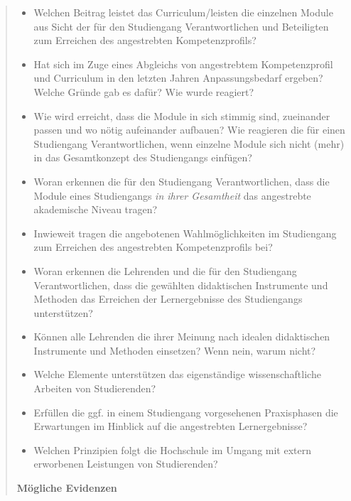 \begin{quote}
\begin{itemize}
\item
  Welchen Beitrag leistet das Curriculum/leisten die einzelnen Module
  aus Sicht der für den Studiengang Verantwortlichen und Beteiligten zum
  Erreichen des angestrebten Kompetenzprofils?
\item
  Hat sich im Zuge eines Abgleichs von angestrebtem Kompetenzprofil und
  Curriculum in den letzten Jahren Anpassungsbedarf ergeben? Welche
  Gründe gab es dafür? Wie wurde reagiert?
\item
  Wie wird erreicht, dass die Module in sich stimmig sind, zueinander
  passen und wo nötig aufeinander aufbauen? Wie reagieren die für einen
  Studiengang Verantwortlichen, wenn einzelne Module sich nicht (mehr)
  in das Gesamtkonzept des Studiengangs einfügen?
\item
  Woran erkennen die für den Studiengang Verantwortlichen, dass die
  Module eines Studiengangs \emph{in ihrer Gesamtheit} das angestrebte
  akademische Niveau tragen?
\item
  Inwieweit tragen die angebotenen Wahlmöglichkeiten im Studiengang zum
  Erreichen des angestrebten Kompetenzprofils bei?
\item
  Woran erkennen die Lehrenden und die für den Studiengang
  Verantwortlichen, dass die gewählten didaktischen Instrumente und
  Methoden das Erreichen der Lernergebnisse des Studiengangs
  unterstützen?
\item
  Können alle Lehrenden die ihrer Meinung nach idealen didaktischen
  Instrumente und Methoden einsetzen? Wenn nein, warum nicht?
\item
  Welche Elemente unterstützen das eigenständige wissenschaftliche
  Arbeiten von Studierenden?
\item
  Erfüllen die ggf. in einem Studiengang vorgesehenen Praxisphasen die
  Erwartungen im Hinblick auf die angestrebten Lernergebnisse?
\item
  Welchen Prinzipien folgt die Hochschule im Umgang mit extern
  erworbenen Leistungen von Studierenden?
\end{itemize}

\textbf{Mögliche Evidenzen}


\end{quote}

